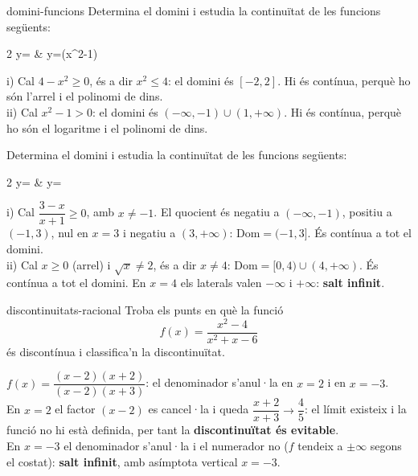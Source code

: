 \begin{apartats}

\begin{tria}{domini-funcions}
Determina el domini i estudia la continuïtat de les funcions següents:
\begin{graella}{2}
  \sa y= & \sa y=\ln\left(x^2-1\right)
\end{graella}

\begin{solucio}
i) Cal $4-x^2\ge0$, és a dir $x^2\le4$: el domini és $[-2,2]$. Hi és contínua, perquè ho són
l'arrel i el polinomi de dins.\\
ii) Cal $x^2-1>0$: el domini és $(-\infty,-1)\cup(1,+\infty)$. Hi és contínua, perquè ho són
el logaritme i el polinomi de dins.
\end{solucio}

Determina el domini i estudia la continuïtat de les funcions següents:
\begin{graella}{2}
  \sa y= & \sa y=
\end{graella}

\begin{solucio}
i) Cal $\dfrac{3-x}{x+1}\ge0$, amb $x\ne-1$. El quocient és negatiu a $(-\infty,-1)$, positiu
a $(-1,3)$, nul en $x=3$ i negatiu a $(3,+\infty)$: $\mathrm{Dom}=(-1,3]$. És contínua a tot
el domini.\\
ii) Cal $x\ge0$ (arrel) i $\sqrt{x}\ne2$, és a dir $x\ne4$: $\mathrm{Dom}=[0,4)\cup(4,+\infty)$.
És contínua a tot el domini. En $x=4$ els laterals valen $-\infty$ i $+\infty$:
\textbf{salt infinit}.
\end{solucio}
\end{tria}

\begin{tria}{discontinuitats-racional}
Troba els punts en què la funció
\[
f(x)=\frac{x^2-4}{x^2+x-6}
\]
és discontínua i classifica'n la discontinuïtat.

\begin{solucio}
$f(x)=\dfrac{(x-2)(x+2)}{(x-2)(x+3)}$: el denominador s'anul·la en $x=2$ i en $x=-3$.\\
En $x=2$ el factor $(x-2)$ es cancel·la i queda $\dfrac{x+2}{x+3}\to\dfrac45$: el límit
existeix i la funció no hi està definida, per tant la \textbf{discontinuïtat és evitable}.\\
En $x=-3$ el denominador s'anul·la i el numerador no ($f$ tendeix a $\pm\infty$ segons el
costat): \textbf{salt infinit}, amb asímptota vertical $x=-3$.
\end{solucio}


\end{tria}
\end{apartats}
